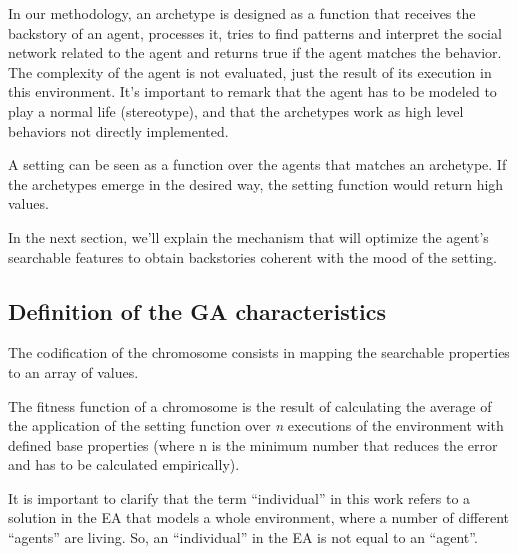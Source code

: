 \documentclass{sig-alternate}
\begin{document}
In our methodology, an archetype is designed as a function that receives the backstory of an agent, processes it, tries to find patterns and interpret the social network related to the agent and returns true if the agent matches the behavior. 
The complexity of the agent is not evaluated, just the result of its execution in this environment. It's important to remark that the agent has to be modeled to play a normal life (stereotype), and that the archetypes work as high level behaviors not directly implemented.

A setting can be seen as a function over the agents that matches an archetype. If the archetypes emerge in the desired way, the setting function would return high values.

In the next section, we'll explain the mechanism that will optimize the agent's searchable features to obtain backstories coherent with the mood of the setting.

\subsection{Definition of the GA characteristics}


The codification of the chromosome consists in mapping the searchable properties to an array of values. %

The fitness function of a chromosome is the result of calculating the average of the application of the setting function over \textit{n} executions of the environment with defined base properties (where n is the minimum number that reduces the error and has to be calculated empirically).

It is important to clarify that the term ``individual'' in this work refers to a solution in the EA that models a whole environment, where a number of different ``agents'' are living. So, an ``individual'' in the EA is not equal to an ``agent''.  %
\end{document}
